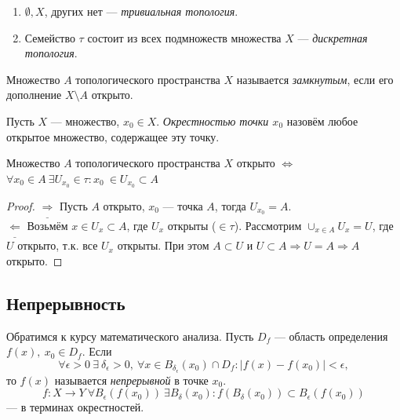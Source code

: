\begin{example}
    \begin{enumerate}
        \item $\emptyset, X$, других нет — \textit{тривиальная топология}.
        \item Семейство $\tau$ состоит из всех подмножеств множества $X$ — \textit{дискретная топология}.
    \end{enumerate}
\end{example}

\begin{definition}
    Множество $A$ топологического пространства $X$ называется \textit{замкнутым}, если его дополнение $X \setminus A$ открыто.
\end{definition}

\begin{definition}
    Пусть $X$ — множество, $x_0 \in X$. \textit{Окрестностью точки $x_0$} назовём любое открытое множество, содержащее эту точку.
\end{definition}

\begin{statement}
    Множество $A$ топологического пространства $X$ открыто $\Leftrightarrow$ $\forall x_0 \in A \ \exists U_{x_0} \in \tau: x_0 \ \in U_{x_0} \subset A$
\end{statement}
\begin{proof}
    $\underline{\Longrightarrow}$ Пусть $A$ открыто, $x_0$ — точка $A$, тогда $U_{x_0} = A$. \\
    $\underline{\Longleftarrow}$ Возьмём $x \in U_x \subset A$, где $U_x$ открыты ($\in \tau$).
    Рассмотрим $\cup_{x \in A} U_x = U$, где $U$ открыто, т.к. все $U_x$ открыты.
    При этом $A \subset U$ и $U \subset A \Rightarrow U = A \Rightarrow A$ открыто.
\end{proof}

\subsection{Непрерывность}
\begin{definition} Обратимся к курсу математического анализа.
    Пусть $D_f$ — область определения $f(x),\ x_0\in D_f$. Если 
    \[\forall \epsilon>0\ \exists\ \delta_{\epsilon}>0,\ \forall x\in B_{\delta_{\epsilon}}(x_0)\cap D_f: |f(x)-f(x_0)|<\epsilon,\] 
    то $f(x)$ называется \textit{непрерывной} в точке $x_0$. \\
    $$f: X \to Y \ \forall B_{\epsilon}(f(x_0)) \ \exists B_{\delta}(x_0): f(B_{\delta}(x_0)) \subset B_{\epsilon}(f(x_0))$$ — в терминах окрестностей.
\end{definition}

